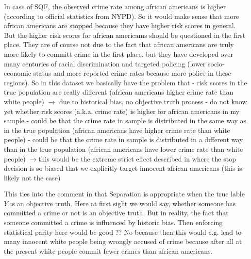 In case of SQF, the observed crime rate among african americans is higher (according to official statistics from NYPD).
So it would make sense that more african americans are stopped because they have higher risk scores in general. But the higher risk
scores for african americams should be questioned in the first place. They are of course not due to the fact that african americans
are truly more likely to committ crime in the first place, but they have developed over many centuries of racial discrimination
and targeted policing (lower socio-economic status and more reported crime rates because more police in these regions).
So in this dataset we basically have the problem that
- risk scores in the true population are really different (african americans higher crime rate than white people) $\rightarrow$ due to historical bias, no objective truth process
- do not know yet whether risk scores (a.k.a. crime rate) is higher for african americans in my sample
- could be that the crime rate in sample is distributed in the same way as in the true population (african americans have higher crime rate than white people)
- could be that the crime rate in sample is distributed in a different way than in the true population (african americans have lower crime rate than white people)
$\rightarrow$this would be the extreme strict effect described in \cite{kallus2018} where the stop decision is so
biased that we explicitly target innocent african americans (this is likely not the case)

This ties into the comment in \cite{castelnovo2022} that Separation is appropriate when
the true lable $Y$ is an objective truth. Here at first sight we would say, whether someone
has committed a crime or not is an objective truth. But in reality, the fact that someone committed
a crime is influenced by historic bias.
Then enforcing statistical parity here would be good ?? No because then this would e.g. lead
to many innocent white people being wrongly accused of crime because after all at the present white people
commit fewer crimes than african americans.
